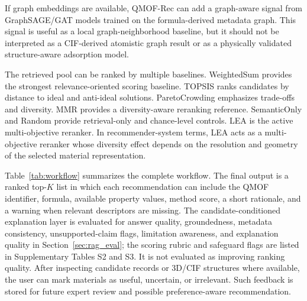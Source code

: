 \documentclass[12pt,a4paper]{article}
\begin{document}
If graph embeddings are available, QMOF-Rec can add a graph-aware signal from GraphSAGE/GAT models trained on the formula-derived metadata graph. This signal is useful as a local graph-neighborhood baseline, but it should not be interpreted as a CIF-derived atomistic graph result or as a physically validated structure-aware adsorption model.

The retrieved pool can be ranked by multiple baselines. WeightedSum provides the strongest relevance-oriented scoring baseline. TOPSIS ranks candidates by distance to ideal and anti-ideal solutions. ParetoCrowding emphasizes trade-offs and diversity. MMR provides a diversity-aware reranking reference. SemanticOnly and Random provide retrieval-only and chance-level controls. LEA is the active multi-objective reranker. In recommender-system terms, LEA acts as a multi-objective reranker whose diversity effect depends on the resolution and geometry of the selected material representation.

Table~\ref{tab:workflow} summarizes the complete workflow. The final output is a ranked top-$K$ list in which each recommendation can include the QMOF identifier, formula, available property values, method score, a short rationale, and a warning when relevant descriptors are missing. The candidate-conditioned explanation layer is evaluated for answer quality, groundedness, metadata consistency, unsupported-claim flags, limitation awareness, and explanation quality in Section~\ref{sec:rag_eval}; the scoring rubric and safeguard flags are listed in Supplementary Tables S2 and S3. It is not evaluated as improving ranking quality. After inspecting candidate records or 3D/CIF structures where available, the user can mark materials as useful, uncertain, or irrelevant. Such feedback is stored for future expert review and possible preference-aware recommendation.
\end{document}
